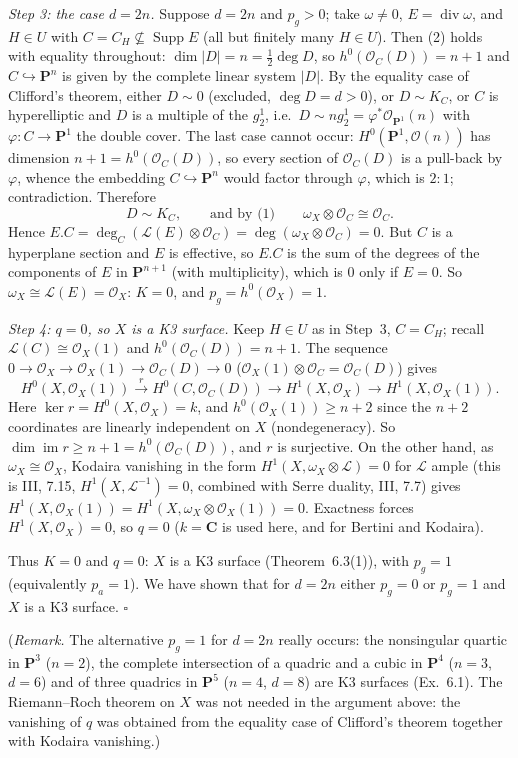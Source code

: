 \documentclass[11pt]{article}
\begin{document}
\emph{Step 3: the case $d=2n$.} Suppose $d=2n$ and $p_g>0$; take $\omega\ne0$, $E=\operatorname{div}\omega$, and $H\in U$ with $C=C_H\not\subseteq\operatorname{Supp}E$ (all but finitely many $H\in U$). Then (2) holds with equality throughout: $\dim|D|=n=\tfrac12\deg D$, so $h^0(\mathcal O_C(D))=n+1$ and $C\hookrightarrow\mathbf P^n$ is given by the complete linear system $|D|$. By the equality case of Clifford's theorem, either $D\sim0$ (excluded, $\deg D=d>0$), or $D\sim K_C$, or $C$ is hyperelliptic and $D$ is a multiple of the $g^1_2$, i.e.\ $D\sim n g^1_2=\varphi^*\mathcal O_{\mathbf P^1}(n)$ with $\varphi:C\to\mathbf P^1$ the double cover. The last case cannot occur: $H^0(\mathbf P^1,\mathcal O(n))$ has dimension $n+1=h^0(\mathcal O_C(D))$, so every section of $\mathcal O_C(D)$ is a pull-back by $\varphi$, whence the embedding $C\hookrightarrow\mathbf P^n$ would factor through $\varphi$, which is $2:1$; contradiction. Therefore
\[
D\sim K_C,\qquad\text{and by (1)}\qquad \omega_X\otimes\mathcal O_C\cong\mathcal O_C .
\]
Hence $E.C=\deg_C(\mathcal L(E)\otimes\mathcal O_C)=\deg(\omega_X\otimes\mathcal O_C)=0$. But $C$ is a hyperplane section and $E$ is effective, so $E.C$ is the sum of the degrees of the components of $E$ in $\mathbf P^{n+1}$ (with multiplicity), which is $0$ only if $E=0$. So $\omega_X\cong\mathcal L(E)=\mathcal O_X$: $K=0$, and $p_g=h^0(\mathcal O_X)=1$.

\emph{Step 4: $q=0$, so $X$ is a K3 surface.} Keep $H\in U$ as in Step~3, $C=C_H$; recall $\mathcal L(C)\cong\mathcal O_X(1)$ and $h^0(\mathcal O_C(D))=n+1$. The sequence $0\to\mathcal O_X\to\mathcal O_X(1)\to\mathcal O_C(D)\to0$ ($\mathcal O_X(1)\otimes\mathcal O_C=\mathcal O_C(D)$) gives
\[
H^0(X,\mathcal O_X(1))\xrightarrow{\ r\ }H^0(C,\mathcal O_C(D))\to H^1(X,\mathcal O_X)\to H^1(X,\mathcal O_X(1)).
\]
Here $\ker r=H^0(X,\mathcal O_X)=k$, and $h^0(\mathcal O_X(1))\ge n+2$ since the $n+2$ coordinates are linearly independent on $X$ (nondegeneracy). So $\dim\operatorname{im}r\ge n+1=h^0(\mathcal O_C(D))$, and $r$ is surjective. On the other hand, as $\omega_X\cong\mathcal O_X$, Kodaira vanishing in the form $H^1(X,\omega_X\otimes\mathcal L)=0$ for $\mathcal L$ ample (this is III, 7.15, $H^1(X,\mathcal L^{-1})=0$, combined with Serre duality, III, 7.7) gives $H^1(X,\mathcal O_X(1))=H^1(X,\omega_X\otimes\mathcal O_X(1))=0$. Exactness forces $H^1(X,\mathcal O_X)=0$, so $q=0$ ($k=\mathbf C$ is used here, and for Bertini and Kodaira).

Thus $K=0$ and $q=0$: $X$ is a K3 surface (Theorem~6.3(1)), with $p_g=1$ (equivalently $p_a=1$). We have shown that for $d=2n$ either $p_g=0$ or $p_g=1$ and $X$ is a K3 surface. \hfill$\square$

(\emph{Remark.} The alternative $p_g=1$ for $d=2n$ really occurs: the nonsingular quartic in $\mathbf P^3$ ($n=2$), the complete intersection of a quadric and a cubic in $\mathbf P^4$ ($n=3$, $d=6$) and of three quadrics in $\mathbf P^5$ ($n=4$, $d=8$) are K3 surfaces (Ex.~6.1). The Riemann--Roch theorem on $X$ was not needed in the argument above: the vanishing of $q$ was obtained from the equality case of Clifford's theorem together with Kodaira vanishing.)
\end{document}
